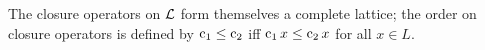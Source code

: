 The closure operators on $\mathcal{L}$ form themselves a complete lattice; the order on
closure operators is defined by $\operatorname{c}_1 \leq  \operatorname{c}_2$ iff
$\operatorname{c}_1 x \leq  \operatorname{c}_2 x$ for all $x \in L$. 




\printbibliography
























